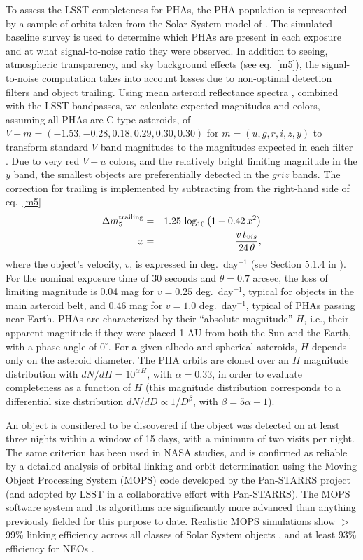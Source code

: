 To assess the LSST completeness for PHAs, the PHA
population is represented by a sample of orbits taken from the Solar
System model of \citet{2007AAS...211.4721G}.
The simulated baseline survey is used to determine which PHAs are present in
each exposure and at what signal-to-noise ratio they were observed. In
addition to  seeing, atmospheric transparency, and sky background effects
(see eq.~\ref{m5}), the signal-to-noise computation takes into account losses
due to non-optimal detection filters and object trailing. Using mean asteroid reflectance
spectra \citep{2009Icar..202..160D}, combined with the LSST bandpasses,
we calculate expected magnitudes and colors, assuming all PHAs are C type asteroids, of
$V-m = (-1.53, -0.28, 0.18, 0.29, 0.30, 0.30)$ for $m=(u, g, r, i, z, y)$ to transform
standard $V$ band magnitudes to the magnitudes expected in each filter \citep{2001AJ....122.2749I}.
Due to very red $V-u$ colors, and the relatively bright limiting magnitude in the $y$
band, the smallest objects are preferentially detected in the $griz$ bands.
The correction for trailing is implemented by subtracting from the right-hand
side of eq.~\ref{m5}
\begin{eqnarray}
 \Delta m_5^\mathrm{trailing} & = &1.25\,\log_{10}\left(1+0.42 \, x^2 \right) \\
   x & = & {v \,t_{vis} \over 24 \, \theta},
\end{eqnarray}
where the object's velocity, $v$, is expressed in deg.~day$^{-1}$ (see Section 5.1.4 in 
\citealt{2018Icar..303..181J}).
For the nominal exposure time of 30 seconds and $\theta=0.7$ arcsec, the loss of limiting
magnitude is 0.04 mag for $v=0.25$ deg.~day$^{-1}$, typical for objects in the main
asteroid belt, and 0.46 mag for $v=1.0$ deg.~day$^{-1}$, typical of PHAs passing
near Earth. PHAs are characterized by their ``absolute magnitude''
$H$, i.e., their apparent magnitude if they were placed 1 AU from
both the Sun and the Earth, with a phase angle of $0^\circ$.  For a
given albedo and spherical asteroids, $H$ depends only on the asteroid diameter.  
The PHA orbits are cloned over an $H$ magnitude distribution with $dN/dH =
10^{\alpha \, H}$, with $\alpha=0.33$, in order to evaluate completeness as a function of $H$
(this magnitude distribution corresponds to a differential size distribution $dN/dD \propto 1/D^\beta$,
with $\beta = 5\alpha+1$). 

An object is considered to be discovered if the object was detected on at least three nights within a
window of 15 days, with a minimum of two visits per night. The same criterion has been used in NASA studies,
and is confirmed as reliable by a detailed analysis of orbital linking and orbit determination using the Moving
Object Processing System (MOPS) code \citep{2017AJ....154...12V,2017AJ....154...13V,2005AAS...20712102J} developed by the
Pan-STARRS project (and adopted by LSST in a collaborative effort with Pan-STARRS). The MOPS software
system and its algorithms are significantly more advanced than anything previously
fielded for this purpose to date. Realistic MOPS simulations show
$>$99\% linking efficiency across all classes of Solar System objects \citep{2013PASP..125..357D},
and at least 93\% efficiency for NEOs \citep{2017AJ....154...12V,2017AJ....154...13V}.

